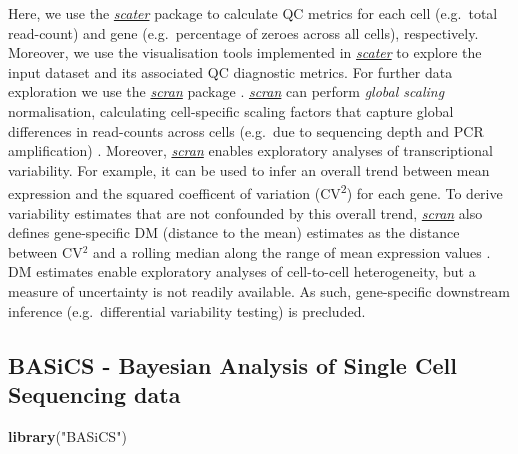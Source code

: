 \documentclass[9pt,a4paper,]{extarticle}
\newenvironment{Shaded}{\begin{snugshade}}{\end{snugshade}}
\newcommand{\KeywordTok}[1]{\textcolor[rgb]{0.13,0.29,0.53}{\textbf{#1}}}
\newcommand{\NormalTok}[1]{#1}
\newcommand{\StringTok}[1]{\textcolor[rgb]{0.31,0.60,0.02}{#1}}
\begin{document}
Here, we use the \emph{\href{https://bioconductor.org/packages/3.11/scater}{scater}} package \citep{McCarthy2017} to calculate
QC metrics for each cell (e.g.~total read-count) and gene (e.g.~percentage of
zeroes across all cells), respectively.
Moreover, we use the visualisation tools implemented in \emph{\href{https://bioconductor.org/packages/3.11/scater}{scater}} to
explore the input dataset and its associated QC diagnostic metrics.
For further data exploration we use the \emph{\href{https://bioconductor.org/packages/3.11/scran}{scran}} package \citep{Lun2016}.
\emph{\href{https://bioconductor.org/packages/3.11/scran}{scran}} can perform \emph{global scaling} normalisation, calculating
cell-specific scaling factors that capture global differences in read-counts
across cells (e.g.~due to sequencing depth and PCR amplification)
\citep{Lun2016pooling}.
Moreover, \emph{\href{https://bioconductor.org/packages/3.11/scran}{scran}} enables exploratory analyses of transcriptional
variability.
For example, it can be used to infer an overall trend between mean expression
and the squared coefficent of variation (CV\textsuperscript{2}) for each gene.
To derive variability estimates that are not confounded by this overall trend,
\emph{\href{https://bioconductor.org/packages/3.11/scran}{scran}} also defines gene-specific DM (distance to the mean)
estimates as the distance between CV\(^2\) and a rolling median along the range
of mean expression values \citep{Kolodziejczyk2015cell}.
DM estimates enable exploratory analyses of cell-to-cell heterogeneity, but a
measure of uncertainty is not readily available. As such, gene-specific
downstream inference (e.g.~differential variability testing) is precluded.

\hypertarget{basics---bayesian-analysis-of-single-cell-sequencing-data}{%
\subsection{BASiCS - Bayesian Analysis of Single Cell Sequencing data}\label{basics---bayesian-analysis-of-single-cell-sequencing-data}}

\begin{Shaded}
\begin{Highlighting}[]
\KeywordTok{library}\NormalTok{(}\StringTok{"BASiCS"}\NormalTok{)}
\end{Highlighting}
\end{Shaded}
\end{document}
